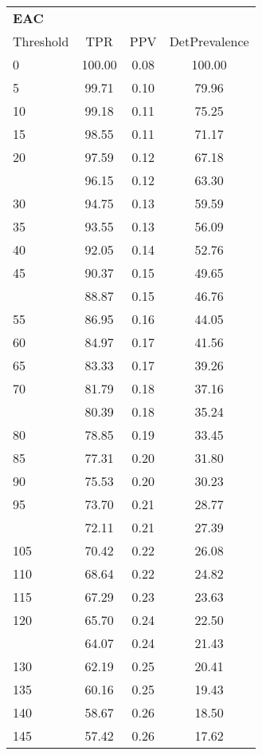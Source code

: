 \begin{table}[ht]
\centering
\tiny
\begin{tabular}{lccc}
  \toprule
  \multicolumn{4}{l}{\textbf{EAC}} \\\addlinespace
Threshold & TPR & PPV & DetPrevalence \\ 
  \midrule
0 & 100.00 & 0.08 & 100.00 \\ 
  5 & 99.71 & 0.10 & 79.96 \\ 
  10 & 99.18 & 0.11 & 75.25 \\ 
  15 & 98.55 & 0.11 & 71.17 \\ 
  20 & 97.59 & 0.12 & 67.18 \\ 
   \addlinespace
25 & 96.15 & 0.12 & 63.30 \\ 
  30 & 94.75 & 0.13 & 59.59 \\ 
  35 & 93.55 & 0.13 & 56.09 \\ 
  40 & 92.05 & 0.14 & 52.76 \\ 
  45 & 90.37 & 0.15 & 49.65 \\ 
   \addlinespace
50 & 88.87 & 0.15 & 46.76 \\ 
  55 & 86.95 & 0.16 & 44.05 \\ 
  60 & 84.97 & 0.17 & 41.56 \\ 
  65 & 83.33 & 0.17 & 39.26 \\ 
  70 & 81.79 & 0.18 & 37.16 \\ 
   \addlinespace
75 & 80.39 & 0.18 & 35.24 \\ 
  80 & 78.85 & 0.19 & 33.45 \\ 
  85 & 77.31 & 0.20 & 31.80 \\ 
  90 & 75.53 & 0.20 & 30.23 \\ 
  95 & 73.70 & 0.21 & 28.77 \\ 
   \addlinespace
100 & 72.11 & 0.21 & 27.39 \\ 
  105 & 70.42 & 0.22 & 26.08 \\ 
  110 & 68.64 & 0.22 & 24.82 \\ 
  115 & 67.29 & 0.23 & 23.63 \\ 
  120 & 65.70 & 0.24 & 22.50 \\ 
   \addlinespace
125 & 64.07 & 0.24 & 21.43 \\ 
  130 & 62.19 & 0.25 & 20.41 \\ 
  135 & 60.16 & 0.25 & 19.43 \\ 
  140 & 58.67 & 0.26 & 18.50 \\ 
  145 & 57.42 & 0.26 & 17.62 \\ 

\end{tabular}
\end{table}
